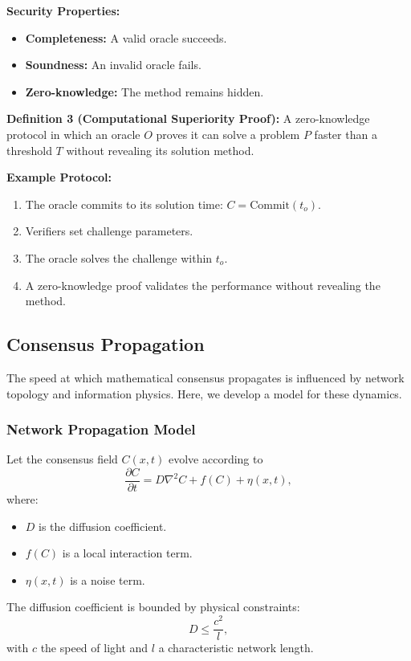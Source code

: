 \documentclass[11pt]{article}
\begin{document}
\noindent\textbf{Security Properties:}
\begin{itemize}
    \item \textbf{Completeness:} A valid oracle succeeds.
    \item \textbf{Soundness:} An invalid oracle fails.
    \item \textbf{Zero-knowledge:} The method remains hidden.
\end{itemize}

\noindent
\textbf{Definition 3 (Computational Superiority Proof):} A zero-knowledge protocol in which an oracle $O$ proves it can solve a problem $P$ faster than a threshold $T$ without revealing its solution method.

\noindent
\textbf{Example Protocol:}
\begin{enumerate}[label=(\arabic*)]
    \item The oracle commits to its solution time: $C = \text{Commit}(t_o)$.
    \item Verifiers set challenge parameters.
    \item The oracle solves the challenge within $t_o$.
    \item A zero-knowledge proof validates the performance without revealing the method.
\end{enumerate}

\subsection{Consensus Propagation}

The speed at which mathematical consensus propagates is influenced by network topology and information physics. Here, we develop a model for these dynamics.

\subsubsection{Network Propagation Model}

Let the consensus field $C(x,t)$ evolve according to
\[
\frac{\partial C}{\partial t} = D \nabla^2 C + f(C) + \eta(x,t),
\]
where:
\begin{itemize}
    \item $D$ is the diffusion coefficient.
    \item $f(C)$ is a local interaction term.
    \item $\eta(x,t)$ is a noise term.
\end{itemize}
The diffusion coefficient is bounded by physical constraints:
\[
D \leq \frac{c^2}{l},
\]
with $c$ the speed of light and $l$ a characteristic network length.
\end{document}
